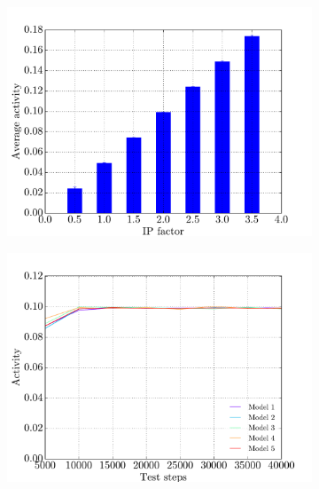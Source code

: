 \begin{figure}[!t]
\begin{subfigure}{0.48\textwidth}
        \includegraphics[width=\textwidth]{results/h_ip_activity_model1}
        \caption{}
        \label{fig:hip-activity-model1}
    \end{subfigure}
    \hfill
    \begin{subfigure}{0.48\textwidth}
    	\centering
        \includegraphics[width=\textwidth]{results/h_ip_test_traces_activity}
        \caption{}
        \label{fig:hip-activity-trace}
    \end{subfigure}

\end{figure}
